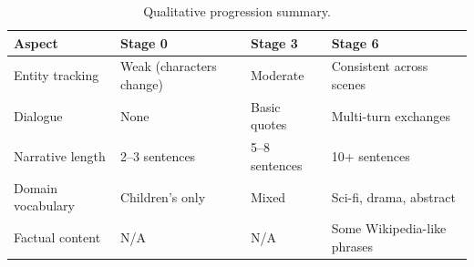 \begin{table}[H]
\centering\small
\caption{Qualitative progression summary.}
\begin{tabular}{lp{4cm}p{4cm}p{4cm}}
\toprule
\textbf{Aspect} & \textbf{Stage 0} & \textbf{Stage 3} & \textbf{Stage 6} \\
\midrule
Entity tracking    & Weak (characters change) & Moderate & Consistent across scenes \\
Dialogue           & None                      & Basic quotes & Multi-turn exchanges \\
Narrative length   & 2--3 sentences            & 5--8 sentences & 10+ sentences \\
Domain vocabulary  & Children's only           & Mixed & Sci-fi, drama, abstract \\
Factual content    & N/A                       & N/A & Some Wikipedia-like phrases \\
\bottomrule
\end{tabular}
\end{table}
